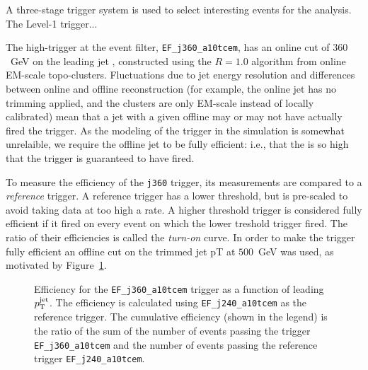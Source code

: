 A three-stage trigger system is used to select interesting events for the analysis. The Level-1 trigger... 


The high-\pt trigger at the event filter, \texttt{EF\_j360\_a10tcem}, has an online cut of $360$~GeV on the leading jet \pt, constructed using the \antikt $R=1.0$ algorithm from online EM-scale topo-clusters. Fluctuations due to jet energy resolution and differences between online and offline reconstruction (for example, the online jet has no trimming applied, and the clusters are only EM-scale instead of locally calibrated) mean that a jet with a given offline \pt may or may not have actually fired the trigger. As the modeling of the trigger in the simulation is somewhat unrelaible, we require the offline jet \pt to be fully efficient: i.e., that the \pt is so high that the trigger is guaranteed to have fired.

To measure the efficiency of the \texttt{j360} trigger, its measurements are compared to a \textit{reference} trigger. A reference trigger has a lower \pt threshold, but is pre-scaled to avoid taking data at too high a rate. A higher \pt threshold trigger is considered fully efficient if it fired on every event on which the lower \pt treshold trigger fired. The ratio of their efficiencies is called the \textit{turn-on} curve. In order to make the trigger fully efficient an offline \pt cut on the trimmed jet pT at $500$~GeV was used, as motivated by Figure~\ref{fig:search:search:trig:pt1}. 

\begin{figure}[!ht]
  \centering
    \caption{Efficiency for the \texttt{EF\_j360\_a10tcem} trigger as a function of leading $p_{\text{T}}^\mathrm{jet}$. The efficiency is calculated using \texttt{EF\_j240\_a10tcem} as the reference trigger. The cumulative efficiency (shown in the legend) is the ratio of the sum of the number of events passing the trigger \texttt{EF\_j360\_a10tcem} and the number of events passing the reference trigger \texttt{EF\_j240\_a10tcem}. }
  \label{fig:search:search:trig:pt1}
\end{figure}

